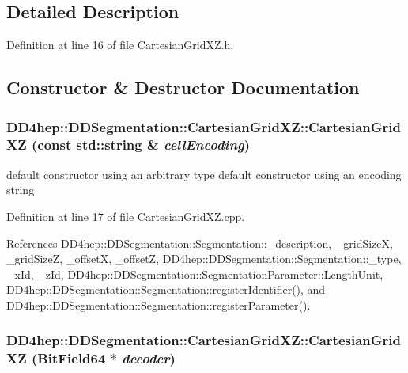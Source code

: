 \subsection{Detailed Description}


Definition at line 16 of file CartesianGridXZ.h.

\subsection{Constructor \& Destructor Documentation}
\hypertarget{class_d_d4hep_1_1_d_d_segmentation_1_1_cartesian_grid_x_z_a30db21b84e994f6e735274ac33a2b6af}{
\subsubsection[{CartesianGridXZ}]{\setlength{\rightskip}{0pt plus 5cm}DD4hep::DDSegmentation::CartesianGridXZ::CartesianGridXZ (const std::string \& {\em cellEncoding})}}
\label{class_d_d4hep_1_1_d_d_segmentation_1_1_cartesian_grid_x_z_a30db21b84e994f6e735274ac33a2b6af}


default constructor using an arbitrary type default constructor using an encoding string 

Definition at line 17 of file CartesianGridXZ.cpp.

References DD4hep::DDSegmentation::Segmentation::\_\-description, \_\-gridSizeX, \_\-gridSizeZ, \_\-offsetX, \_\-offsetZ, DD4hep::DDSegmentation::Segmentation::\_\-type, \_\-xId, \_\-zId, DD4hep::DDSegmentation::SegmentationParameter::LengthUnit, DD4hep::DDSegmentation::Segmentation::registerIdentifier(), and DD4hep::DDSegmentation::Segmentation::registerParameter().\hypertarget{class_d_d4hep_1_1_d_d_segmentation_1_1_cartesian_grid_x_z_a0a3f69150eb5dae849511529138ba094}{
\subsubsection[{CartesianGridXZ}]{\setlength{\rightskip}{0pt plus 5cm}DD4hep::DDSegmentation::CartesianGridXZ::CartesianGridXZ ({\bf BitField64} $\ast$ {\em decoder})}}
\label{class_d_d4hep_1_1_d_d_segmentation_1_1_cartesian_grid_x_z_a0a3f69150eb5dae849511529138ba094}



